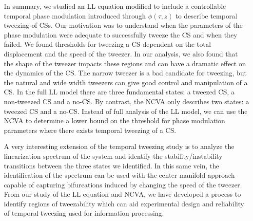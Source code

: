 %
In summary, we studied an LL equation modified to include a controllable temporal phase modulation introduced through $\phi(\tau, z)$ to describe temporal tweezing of CSs.  Our motivation was to understand when the parameters of the phase modulation were adequate to successfully tweeze the CS and when they failed.  We found thresholds for tweezing a CS dependent on the total displacement and the speed of the tweezer.  In our analysis, we also found that the shape of the tweezer impacts these regions and can have a dramatic effect on the dynamics of the CS.  The narrow tweezer is a bad candidate for tweezing, but the natural and wide width tweezers can give good control and manipulation of a CS.  In the full LL model there are three fundamental states: a tweezed CS, a non-tweezed CS and a no-CS. By contrast, the NCVA only describes two states: a tweezed CS and a no-CS.  Instead of full analysis of the LL model, we can use the NCVA to determine a lower bound on the threshold for phase modulation parameters where there exists temporal tweezing of a CS.  

A very interesting extension of the temporal tweezing study is to analyze the linearization spectrum of the system and identify the stability/instability transitions between the three states we identified.  In this same vein, the identification of the spectrum can be used with the center manifold approach capable of capturing bifurcations induced by changing the speed of the tweezer.  From our study of the LL equation and NCVA, we have developed a process to identify regions of tweezability which can aid experimental design and reliability of temporal tweezing used for information processing.
 





